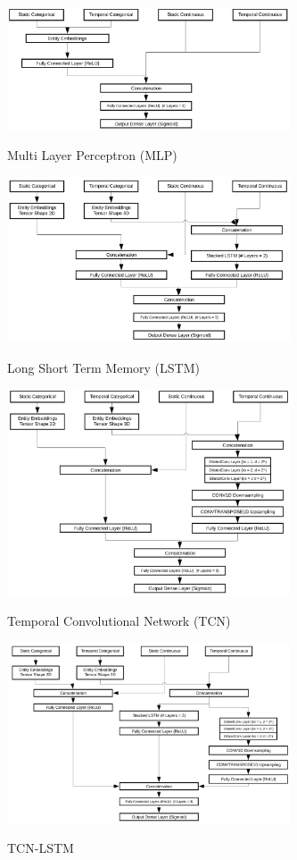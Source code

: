   \begin{figure}[t]
    \centering 
    \caption{Multi Layer Perceptron (MLP)} 
    \includegraphics[width=3.3in]{img/MLP.png} 
    \label{fig:MLP} 
  \end{figure}
  \begin{figure}[t]
    \centering 
    \caption{Long Short Term Memory (LSTM)} 
    \includegraphics[width=3.3in]{img/LSTM.png} 
    \label{fig:LSTM} 
  \end{figure}
  \begin{figure}[t]
    \centering 
    \caption{Temporal Convolutional Network (TCN)} 
    \includegraphics[width=3.3in]{img/TCN.png} 
    \label{fig:TCN} 
  \end{figure}
  \begin{figure}[t]
    \centering 
    \caption{TCN-LSTM} 
    \includegraphics[width=3.3in]{img/TCNLSTM.png} 
    \label{fig:TCN-LSTM} 
  \end{figure}
